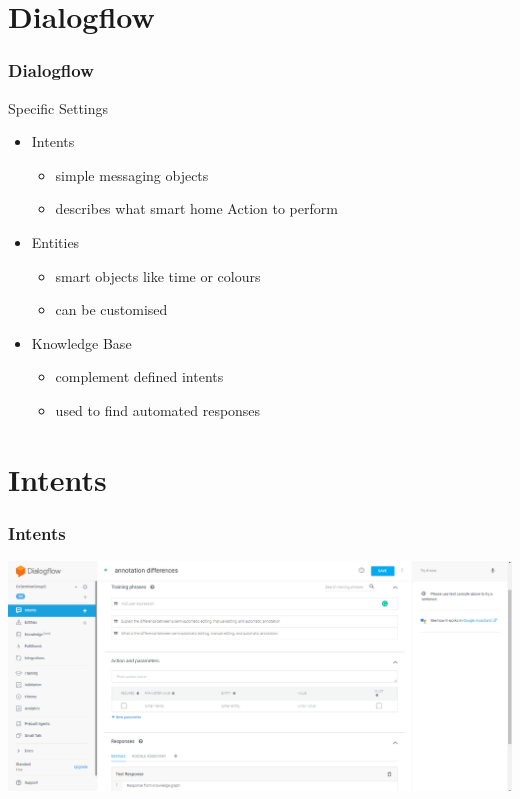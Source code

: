 \documentclass{beamer}
\begin{document}

\section{Dialogflow}

\begin{frame}
\frametitle{Dialogflow}
\begin{block}{Specific Settings}
\begin{itemize}
\item Intents
\begin{itemize}
\item simple messaging objects 
\item describes what smart home Action to perform
\end{itemize}
\item Entities
\begin{itemize}
\item smart objects like time or colours
\item can be customised
\end{itemize}
\item Knowledge Base
\begin{itemize}
\item complement defined intents
\item used to find automated responses
\end{itemize}
\end{itemize}
\end{block}
\end{frame}



\section{Intents}

\begin{frame}
\frametitle{Intents}
\begin{center}
\includegraphics[scale=0.23]{pictures/intents.png}
\end{center}
\end{frame}
\end{document}
